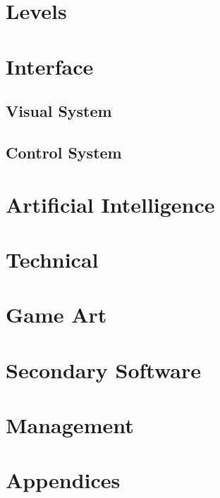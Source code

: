 \documentclass[14pt]{report}
\begin{document}
\chapter{Levels}

\chapter{Interface}
\section{Visual System}
\section{Control System}

\chapter{Artificial Intelligence}

\chapter{Technical}

\chapter{Game Art}

\chapter{Secondary Software}

\chapter{Management}

\chapter{Appendices}
\end{document}
